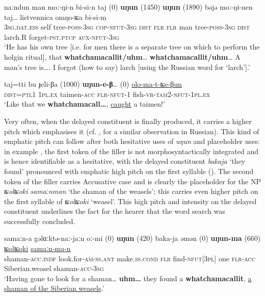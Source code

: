 \documentclass[output=paper]{langscibook}
\begin{document}
\ea \label{ex:pakendorf:45}
\gll naːndun
	man
	moː-ŋi-n
	bi-si-n
	taj
	\textup{(0)}
	\textbf{uŋun}
	\textup{(1450)}
	\textbf{uŋun}
	\textup{(1890)}
	bəjə
	moː-ŋi-nen
	taj…
	listvennica
	omŋo-ʨa
	bi-si-m\\
     \textsc{3sg.dat.ess}
     self
     tree-\textsc{poss-3sg}
     \textsc{cop-nfut-3sg}
     \textsc{dist}
     {}
     \textsc{flr}
     {}
     \textsc{flr}
     {}
     man tree-\textsc{poss-3sg}
     \textsc{dist}
     larch.R
     forget-\textsc{pst.ptcp}
     \textsc{aux-nfut-3sg}\\
\glt ‘He has his own tree [i.e. for men there is a separate tree on which to perform the holgin ritual], that \textbf{whatchamacallit/uhm}… \textbf{whatchamacallit/uhm}… A man’s tree is…. I forgot (how to say) larch [using the Russian word for ‘larch’].’ 
\z

\ea \label{ex:pakendorf:46}
\gll taj=tti bu ɟeli-βa
	\textup{(1000)}
	\textbf{uŋun-e-β}…
	\textup{(0)}
	\uline{olo-ma-t-ʨe-βun}\\
     \textsc{dist=ptl1} \textsc{1pl.ex} taimen-\textsc{acc}
     {}
     \textsc{flr-nfut-1}
     {}
     fish-\textsc{vr-tam2-nfut-1pl.ex}\\
\glt ‘Like that we \textbf{whatchamacall…}, \uline{caught} a taimen!’ 
\z

Very often, when the delayed constituent is finally produced, it carries a higher pitch which emphasises it (cf. \citealt[71--73]{PodlesskayaPodlesskaya2022}, for a similar observation in Russian). This kind of emphatic pitch can follow after both hesitative uses of \textit{uŋun} and placeholder uses: in example , the first token of the filler is not morphosyntactically integrated and is hence identifiable as a hesitative, with the delayed constituent \textit{bakaja} ‘they found’ pronounced with emphatic high pitch on the first syllable (). The second token of the filler carries Accusative case and is clearly the placeholder for the NP \textit{ʨolʨoki samaːnman} ‘the shaman of the weasels’; this carries even higher pitch on the first syllable of \textit{ʨolʨoki} ‘weasel’. This high pitch and intensity on the delayed constituent underlines the fact for the hearer that the word search was successfully concluded.


\ea \label{ex:pakendorf:47}
\gll samaːn-a gəlɑːktə-naː-jaːn oː-mi
	\textup{(0)} \textbf{uŋun} \textup{(420)}
	baka-ja əmən
	\textup{(0)} \textbf{uŋun-ma} \textup{(660)}
	\uline{ʨolʨoki} \uline{samaːn-ma-n}\\
     shaman-\textsc{acc.indf} look.for-\textsc{am-ss.ant} make.\textsc{ss.cond}
     {} \textsc{flr} {}
     find-\textsc{nfut[3pl]} one 
     {} \textsc{flr-acc} {}
     Siberian.weasel shaman-\textsc{acc-3sg}\\
\glt ‘Having gone to look for a shaman… \textbf{uhm…} they found a \textbf{whatchamacallit}, \uline{a shaman of the Siberian weasels}.’ 
\z
\end{document}
